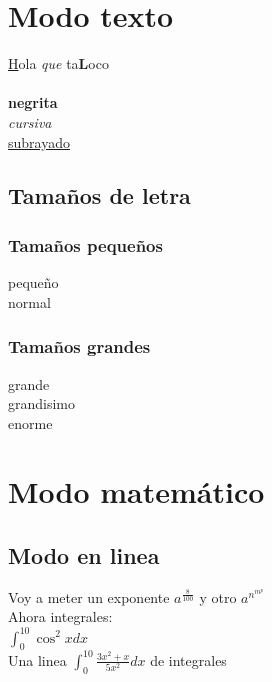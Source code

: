 \documentclass[10pt,a4paper]{report}
\begin{document}
\pagebreak
\tableofcontents
\pagebreak

\chapter{Modo texto}

{\underline Hola} {\it que} ta{\bf L}oco \\
\\
{\bf negrita} \\
{\it cursiva} \\
\underline{subrayado}

\section{Tamaños de letra}

\subsection{Tamaños pequeños}

{\tiny pequeño} \\
{\normalsize normal} \\

\subsection{Tamaños grandes}

{\large grande} \\
{\LARGE grandisimo} \\
{\huge enorme} \\

\chapter{Modo matemático}

\section{Modo en linea}

Voy a meter un exponente $ a^{\frac{8}{100}} $ y otro $ a^{n^{m^p}} $ \\


Ahora integrales: \\

$ \int_{0}^{10} \cos^2 x dx $ \\

Una linea $ \int_{0}^{10} \frac{3x^2+x}{5x^2} dx $ de integrales
\end{document}
